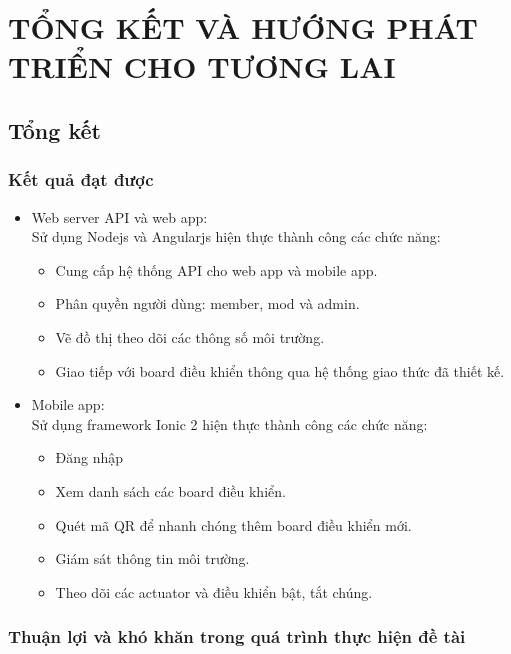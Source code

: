 \documentclass[a4paper,12pt,oneside]{article}
\begin{document}
\newpage
\section{TỔNG KẾT VÀ HƯỚNG PHÁT TRIỂN CHO TƯƠNG LAI}
\subsection{Tổng kết}
	\subsubsection{Kết quả đạt được}
	\begin{itemize}
	\item Web server API và web app: \\
	Sử dụng Nodejs và Angularjs hiện thực thành công các chức năng: 
		\begin{itemize}
			\item Cung cấp hệ thống API cho web app và mobile app. 

			\item Phân quyền người dùng: member, mod và admin. 

			\item Vẽ đồ thị theo dõi các thông số môi trường. 

			\item Giao tiếp với board điều khiển thông qua hệ thống giao thức đã thiết kế. 
		\end{itemize}

	\item Mobile app: \\
	Sử dụng framework Ionic 2 hiện thực thành công các chức năng: 
		\begin{itemize}
			\item Đăng nhập 

			\item Xem danh sách các board điều khiển. 

			\item Quét mã QR để nhanh chóng thêm board điều khiển mới. 

			\item Giám sát thông tin môi trường. 

			\item Theo dõi các actuator và điều khiển bật, tắt chúng. 
		\end{itemize}
	\end{itemize}
	
	\subsubsection{Thuận lợi và khó khăn trong quá trình thực hiện đề tài}	
\end{document}
